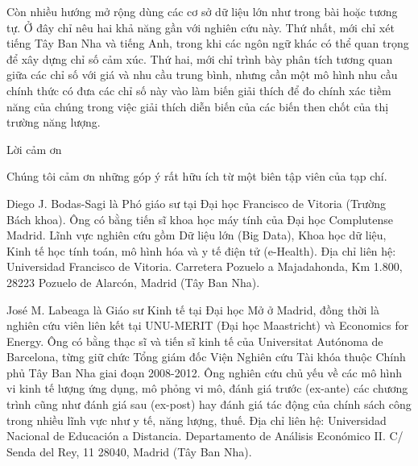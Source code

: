 Còn nhiều hướng mở rộng dùng các cơ sở dữ liệu lớn như trong bài hoặc tương tự. Ở đây chỉ nêu hai khả năng gần với nghiên cứu này. Thứ nhất, mới chỉ xét tiếng Tây Ban Nha và tiếng Anh, trong khi các ngôn ngữ khác có thể quan trọng để xây dựng chỉ số cảm xúc. Thứ hai, mới chỉ trình bày phân tích tương quan giữa các chỉ số với giá và nhu cầu trung bình, nhưng cần một mô hình nhu cầu chính thức có đưa các chỉ số này vào làm biến giải thích để đo chính xác tiềm năng của chúng trong việc giải thích diễn biến của các biến then chốt của thị trường năng lượng.

Lời cảm ơn

Chúng tôi cảm ơn những góp ý rất hữu ích từ một biên tập viên của tạp chí.


Diego J. Bodas-Sagi là Phó giáo sư tại Đại học Francisco de Vitoria (Trường Bách khoa). Ông có bằng tiến sĩ khoa học máy tính của Đại học Complutense Madrid. Lĩnh vực nghiên cứu gồm Dữ liệu lớn (Big Data), Khoa học dữ liệu, Kinh tế học tính toán, mô hình hóa và y tế điện tử (e-Health). Địa chỉ liên hệ: Universidad Francisco de Vitoria. Carretera Pozuelo a Majadahonda, Km 1.800, 28223 Pozuelo de Alarcón, Madrid (Tây Ban Nha).

José M. Labeaga là Giáo sư Kinh tế tại Đại học Mở ở Madrid, đồng thời là nghiên cứu viên liên kết tại UNU-MERIT (Đại học Maastricht) và Economics for Energy. Ông có bằng thạc sĩ và tiến sĩ kinh tế của Universitat Autónoma de Barcelona, từng giữ chức Tổng giám đốc Viện Nghiên cứu Tài khóa thuộc Chính phủ Tây Ban Nha giai đoạn 2008-2012. Ông nghiên cứu chủ yếu về các mô hình vi kinh tế lượng ứng dụng, mô phỏng vi mô, đánh giá trước (ex-ante) các chương trình cũng như đánh giá sau (ex-post) hay đánh giá tác động của chính sách công trong nhiều lĩnh vực như y tế, năng lượng, thuế. Địa chỉ liên hệ: Universidad Nacional de Educación a Distancia. Departamento de Análisis Económico II. C/ Senda del Rey, 11 28040, Madrid (Tây Ban Nha).
